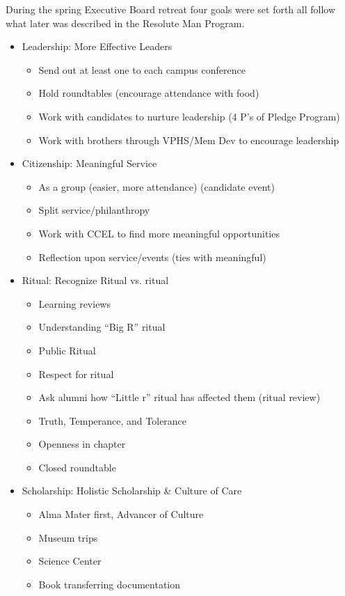 	During the spring Executive Board retreat four goals were set forth all follow what later was described in the Resolute Man Program. 
	\begin{itemize}
		\item Leadership: More Effective Leaders
		  \begin{itemize}
		   \item Send out at least one to each campus conference
		   \item Hold roundtables (encourage attendance with food)
		   \item Work with candidates to nurture leadership (4 P's of Pledge Program)
		   \item Work with brothers through VPHS/Mem Dev to encourage leadership
		  \end{itemize}

		\item Citizenship: Meaningful Service
		  \begin{itemize}
		   \item As a group (easier, more attendance) (candidate event)
		   \item Split service/philanthropy
		   \item Work with CCEL to find more meaningful opportunities
		   \item Reflection upon service/events (ties with meaningful)
		  \end{itemize}

		\item Ritual: Recognize Ritual vs. ritual
		  \begin{itemize}
		   \item Learning reviews
		   \item Understanding ``Big R'' ritual
		   \item Public Ritual
		   \item Respect for ritual
		   \item Ask alumni how ``Little r'' ritual has affected them (ritual review)
		   \item Truth, Temperance, and Tolerance
		   \item Openness in chapter
		   \item Closed roundtable
		  \end{itemize}
		  
		\item Scholarship: Holistic Scholarship \& Culture of Care
		  \begin{itemize}
		   \item Alma Mater first, Advancer of Culture
		   \item Museum trips
		   \item Science Center
		   \item Book transferring documentation
		  \end{itemize}

	\end{itemize} 
